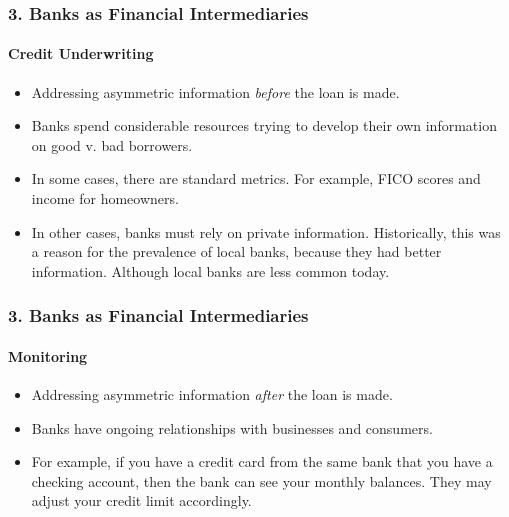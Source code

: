 \documentclass{beamer}
\begin{document}
\begin{frame}[t]
    \frametitle{3. Banks as Financial Intermediaries}
    \framesubtitle{Credit Underwriting}

    \begin{itemize}
        \item Addressing asymmetric information \textit{before} the loan is made.
        \item Banks spend considerable resources trying to develop their own information on good v. bad borrowers.
        \item In some cases, there are standard metrics.   For example, FICO scores and income for homeowners.
        \item In other cases, banks must rely on private information.   Historically, this was a reason for the prevalence of local banks, because they had better information.   Although local banks are less common today.
    \end{itemize}

\end{frame}

\begin{frame}[t]
    \frametitle{3. Banks as Financial Intermediaries}
    \framesubtitle{Monitoring}

    \begin{itemize}
        \item Addressing asymmetric information \textit{after} the loan is made.
        \item Banks have ongoing relationships with businesses and consumers.
        \item For example, if you have a credit card from the same bank that you have a checking account, then the bank can see your monthly balances.   They may adjust your credit limit accordingly.
    \end{itemize}

\end{frame}
\end{document}
